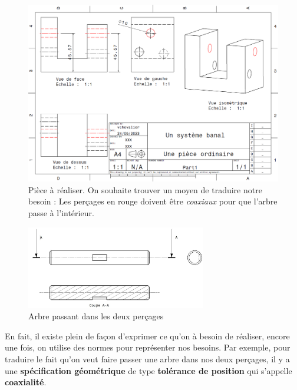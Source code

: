 \documentclass[
	11pt, %
	fleqn, %
	a4paper, %
]{LegrandOrangeBook}
\begin{document}
\begin{figure}[H] %
	\centering %
	\includegraphics[width=1\textwidth]{Images/pieceCdraw.PNG} 
	\caption{Pièce à réaliser. On souhaite trouver un moyen de traduire notre besoin : Les perçages en rouge doivent être \textit{coaxiaux} pour que l'arbre passe à l'intérieur. }
	\label{pieceCdraw} %
\end{figure}

\begin{figure}[H] %
	\centering %
	\includegraphics[width=0.7\textwidth]{Images/arbr2.JPG} 
	\caption{Arbre passant dans les deux perçages}
	\label{arbr2} %
\end{figure}


En fait, il existe plein de façon d'exprimer ce qu'on à besoin de réaliser, encore une fois, on utilise des normes pour représenter nos besoins. Par exemple, pour traduire le fait qu'on veut faire passer une arbre dans nos deux perçages, il y a une \textbf{spécification géométrique} de type \textbf{tolérance de position} qui s'appelle \textbf{coaxialité}.
\end{document}
